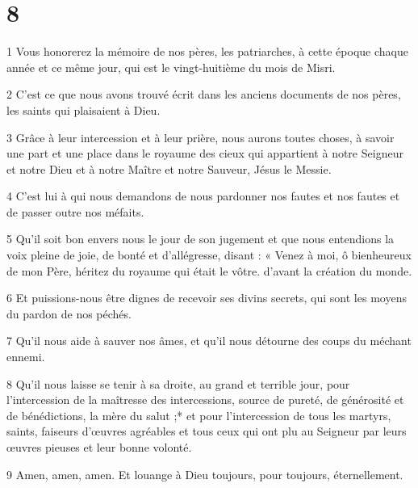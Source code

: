 \chapter{8}

\par 1 Vous honorerez la mémoire de nos pères, les patriarches, à cette époque chaque année et ce même jour, qui est le vingt-huitième du mois de Misri.

\par 2 C'est ce que nous avons trouvé écrit dans les anciens documents de nos pères, les saints qui plaisaient à Dieu.

\par 3 Grâce à leur intercession et à leur prière, nous aurons toutes choses, à savoir une part et une place dans le royaume des cieux qui appartient à notre Seigneur et notre Dieu et à notre Maître et notre Sauveur, Jésus le Messie.

\par 4 C'est lui à qui nous demandons de nous pardonner nos fautes et nos fautes et de passer outre nos méfaits.

\par 5 Qu'il soit bon envers nous le jour de son jugement et que nous entendions la voix pleine de joie, de bonté et d'allégresse, disant : « Venez à moi, ô bienheureux de mon Père, héritez du royaume qui était le vôtre. d'avant la création du monde.

\par 6 Et puissions-nous être dignes de recevoir ses divins secrets, qui sont les moyens du pardon de nos péchés.

\par 7 Qu'il nous aide à sauver nos âmes, et qu'il nous détourne des coups du méchant ennemi.

\par 8 Qu'il nous laisse se tenir à sa droite, au grand et terrible jour, pour l'intercession de la maîtresse des intercessions, source de pureté, de générosité et de bénédictions, la mère du salut ;* et pour l'intercession de tous les martyrs, saints, faiseurs d'œuvres agréables et tous ceux qui ont plu au Seigneur par leurs œuvres pieuses et leur bonne volonté.

\par 9 Amen, amen, amen. Et louange à Dieu toujours, pour toujours, éternellement.


